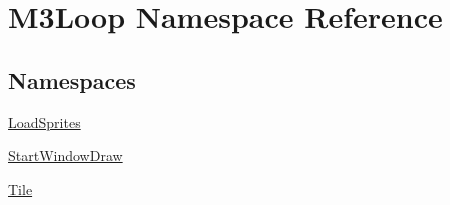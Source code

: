 \hypertarget{namespaceM3Loop}{}\section{M3\+Loop Namespace Reference}
\label{namespaceM3Loop}
\subsection*{Namespaces}
\begin{DoxyCompactItemize}
\item 
 \hyperlink{namespaceM3Loop_1_1LoadSprites}{Load\+Sprites}
\item 
 \hyperlink{namespaceM3Loop_1_1StartWindowDraw}{Start\+Window\+Draw}
\item 
 \hyperlink{namespaceM3Loop_1_1Tile}{Tile}
\end{DoxyCompactItemize}
